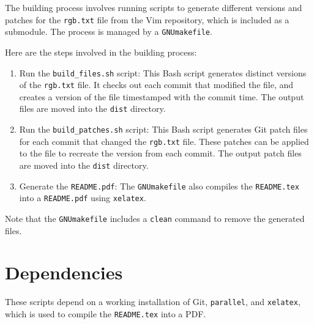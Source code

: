 \documentclass{article}
\begin{document}
The building process involves running scripts to generate different versions and patches for the \texttt{rgb.txt} file from the Vim repository, which is included as a submodule. The process is managed by a \texttt{GNUmakefile}. 

Here are the steps involved in the building process:

\begin{enumerate}
    \item Run the \texttt{build\_files.sh} script: This Bash script generates distinct versions of the \texttt{rgb.txt} file. It checks out each commit that modified the file, and creates a version of the file timestamped with the commit time. The output files are moved into the \texttt{dist} directory.
    \item Run the \texttt{build\_patches.sh} script: This Bash script generates Git patch files for each commit that changed the \texttt{rgb.txt} file. These patches can be applied to the file to recreate the version from each commit. The output patch files are moved into the \texttt{dist} directory.
    \item Generate the \texttt{README.pdf}: The \texttt{GNUmakefile} also compiles the \texttt{README.tex} into a \texttt{README.pdf} using \texttt{xelatex}.
\end{enumerate}

Note that the \texttt{GNUmakefile} includes a \texttt{clean} command to remove the generated files.

\section*{Dependencies}

These scripts depend on a working installation of Git, \texttt{parallel}, and \texttt{xelatex}, which is used to compile the \texttt{README.tex} into a PDF.
\end{document}
